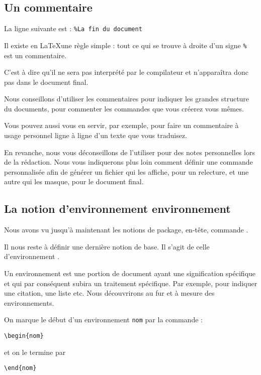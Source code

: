 \subsection{Un commentaire}

La ligne suivante est : \verb|%La fin du document|

Il existe en \LaTeX une règle simple : tout ce qui se trouve à droite d'un signe \verb|%| est un commentaire.

C'est à dire qu'il ne sera pas interprété par le compilateur et n'apparaîtra donc pas dans le document final. 

Nous conseillons d'utiliser les commentaires pour indiquer les grandes structure du documents, pour commenter les commandes que vous créerez vous mêmes. 

Vous pouvez aussi vous en servir, par exemple, pour faire un commentaire à usage personnel ligne à ligne d'un texte que vous traduisez.

En revanche, nous vous déconseillons de l'utiliser pour des notes personnelles lors de la rédaction. Nous vous indiquerons plus loin  comment définir une commande  personnalisée afin de générer un fichier qui les affiche, pour un relecture, et une autre qui les masque, pour le document final.



\subsection{La notion d'environnement environnement }

Nous avons vu jusqu'à maintenant les notions de  package, en-tête, commande . 

Il nous reste à définir une dernière notion de base. Il s'agit de celle d'environnement .

Un environnement  est une portion de document ayant une signification spécifique et qui par conséquent subira un traitement spécifique. Par exemple, pour indiquer une citation, une liste etc. Nous découvrirons au fur et à mesure  des environnements. 


On marque le début d'un environnement  \verb|nom| par la commande  :

\begin{verbatim}
\begin{nom}
\end{verbatim}

et on le termine par 
\begin{verbatim}
\end{nom}
\end{verbatim}



